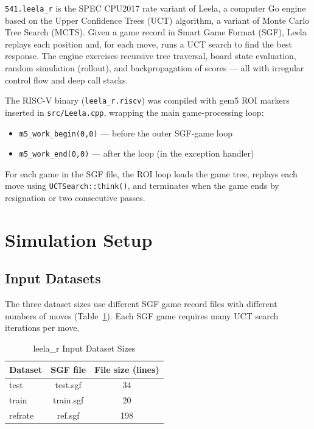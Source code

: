 \documentclass[conference]{IEEEtran}
\begin{document}
\texttt{541.leela\_r} is the SPEC CPU2017 rate variant of Leela, a
computer Go engine based on the Upper Confidence Trees (UCT) algorithm,
a variant of Monte Carlo Tree Search (MCTS). Given a game record in
Smart Game Format (SGF), Leela replays each position and, for each
move, runs a UCT search to find the best response. The engine exercises
recursive tree traversal, board state evaluation, random simulation
(rollout), and backpropagation of scores --- all with irregular control
flow and deep call stacks.

The RISC-V binary (\texttt{leela\_r.riscv}) was compiled with gem5 ROI
markers inserted in \texttt{src/Leela.cpp}, wrapping the main
game-processing loop:

\begin{itemize}
    \item \texttt{m5\_work\_begin(0,0)} --- before the outer SGF-game loop
    \item \texttt{m5\_work\_end(0,0)}   --- after the loop (in the exception handler)
\end{itemize}

For each game in the SGF file, the ROI loop loads the game tree,
replays each move using \texttt{UCTSearch::think()}, and terminates
when the game ends by resignation or two consecutive passes.

\section{Simulation Setup}

\subsection{Input Datasets}

The three dataset sizes use different SGF game record files with
different numbers of moves (Table~\ref{tab:inputs}). Each SGF game
requires many UCT search iterations per move.

\begin{table}[H]
\centering
\caption{leela\_r Input Dataset Sizes}
\label{tab:inputs}
\begin{tabular}{lcc}
\toprule
\textbf{Dataset} & \textbf{SGF file} & \textbf{File size (lines)} \\
\midrule
test    & test.sgf  &  34 \\
train   & train.sgf &  20 \\
refrate & ref.sgf   & 198 \\
\bottomrule
\end{tabular}
\end{table}
\end{document}
